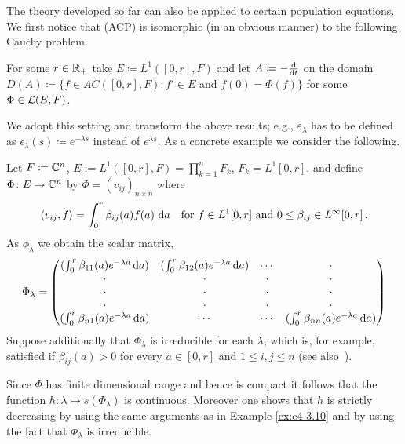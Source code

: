 The theory developed so far can also be applied to certain population equations.
We first notice that (ACP) is isomorphic (in an obvious manner) to the following Cauchy problem.

For some $r \in \mathbb{R}_{+}$ take $E \coloneqq L^{1}([0,r], F)$ and let $A \coloneqq - \frac{\mathop{}\!\mathrm{d}{}}{\mathop{}\!\mathrm{d}{t}}$ on the domain $D(A) \coloneqq \{f \in AC([0,r], F) \colon f' \in E$ and $f(0) = \Phi(f)\}$ for some $\Phi \in \mathcal{L}(E,F)$.

We adopt this setting and transform the above results; e.g., $\varepsilon_{\lambda}$ has to be defined as $\epsilon_{\lambda}(s) \coloneqq e^{-\lambda s}$ instead of $e^{\lambda s}$.
As a concrete example we consider the following.



\begin{example}\label{ex:c4-3.12}
Let $F \coloneqq \mathbb{C}^{n}$, $E:= L^{1}([0,r],F) = \prod_{k=1}^{n} F_{k}$, $F_{k} = L^{1}[0,r]$. and define $\Phi \colon E \to \mathbb{C}^{n}$ by $\Phi = (v_{ij})_{{n\times n}}$ where
\[
\langle v_{ij}, f \rangle = \int_{0}^{r} \beta_{ij}(a)f(a) \, \mathop{}\!\mathrm{d}{a} \quad \text{for } f \in L^{1}[0,r] \text{ and } 0 \leq \beta_{ij} \in L^{\infty}[0,r] \, .
\]
As $\phi_{\lambda}$ we obtain the scalar matrix,
\begin{equation*}\label{eq:c4-3.12-kgk2}
\Phi_{\lambda} = \begin{pmatrix}
(\int_0^r \beta_{11}(a)e^{-\lambda a}\mathop{}\!\mathrm{d}{a}) & (\int_0^r \beta_{12}(a)e^{-\lambda a}\mathop{}\!\mathrm{d}{a}) & \cdots & \cdot \\
\cdot & \cdot & \cdot & \cdot \\
\cdot & \cdot & \cdot & \cdot \\
\cdot & \cdot & \cdot & \cdot \\
(\int_0^r \beta_{n1}(a)e^{-\lambda a}\mathop{}\!\mathrm{d}{a}) & \cdots & \cdots & (\int_0^r \beta_{nn}(a)e^{-\lambda a}\mathop{}\!\mathrm{d}{a})
\end{pmatrix} 
\end{equation*}
Suppose additionally that $\Phi_{\lambda}$ is irreducible for each $\lambda$, which is, for example, satisfied if $\beta_{ij}(a) > 0$ for every $a \in [0,r]$ and $1 \leq i,j \leq n$ (see also \citet[p.257ff]{bellmancooke:1963}\,).

Since $\Phi$ has finite dimensional range and hence is compact it follows that the function $h \colon \lambda \mapsto s(\Phi_{\lambda})$ is continuous.
Moreover one shows that $h$ is strictly decreasing by using the same arguments as in Example \ref{ex:c4-3.10} and by using the fact that $\Phi_{\lambda}$ is irreducible.


\end{example}
